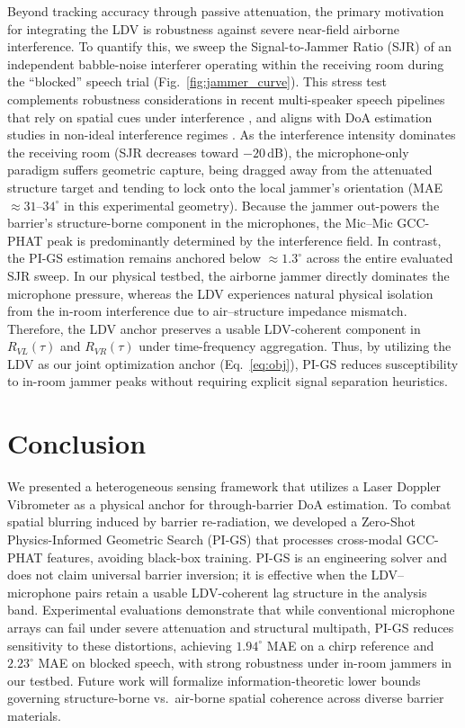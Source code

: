 \documentclass{Interspeech}
\begin{document}
Beyond tracking accuracy through passive attenuation, the primary motivation for integrating the LDV is robustness against severe near-field airborne interference. To quantify this, we sweep the Signal-to-Jammer Ratio (SJR) of an independent babble-noise interferer operating within the receiving room during the ``blocked'' speech trial (Fig.~\ref{fig:jammer_curve}). 
This stress test complements robustness considerations in recent multi-speaker speech pipelines that rely on spatial cues under interference \cite{wechsler2023multi, zhang2024tse}, and aligns with DoA estimation studies in non-ideal interference regimes \cite{feintuch2023neural}. As the interference intensity dominates the receiving room (SJR decreases toward $-20$\,dB), the microphone-only paradigm suffers geometric capture, being dragged away from the attenuated structure target and tending to lock onto the local jammer's orientation (MAE $\approx 31$--$34^\circ$ in this experimental geometry). Because the jammer out-powers the barrier's structure-borne component in the microphones, the Mic--Mic GCC-PHAT peak is predominantly determined by the interference field. In contrast, the PI-GS estimation remains anchored below $\approx 1.3^\circ$ across the entire evaluated SJR sweep. In our physical testbed, the airborne jammer directly dominates the microphone pressure, whereas the LDV experiences natural physical isolation from the in-room interference due to air--structure impedance mismatch. Therefore, the LDV anchor preserves a usable LDV-coherent component in $R_{VL}(\tau)$ and $R_{VR}(\tau)$ under time-frequency aggregation. Thus, by utilizing the LDV as our joint optimization anchor (Eq.~\ref{eq:obj}), PI-GS reduces susceptibility to in-room jammer peaks without requiring explicit signal separation heuristics.

\section{Conclusion}
\label{sec:conclusion}

We presented a heterogeneous sensing framework that utilizes a Laser Doppler Vibrometer as a physical anchor for through-barrier DoA estimation. To combat spatial blurring induced by barrier re-radiation, we developed a Zero-Shot Physics-Informed Geometric Search (PI-GS) that processes cross-modal GCC-PHAT features, avoiding black-box training. PI-GS is an engineering solver and does not claim universal barrier inversion; it is effective when the LDV--microphone pairs retain a usable LDV-coherent lag structure in the analysis band. Experimental evaluations demonstrate that while conventional microphone arrays can fail under severe attenuation and structural multipath, PI-GS reduces sensitivity to these distortions, achieving $1.94^\circ$ MAE on a chirp reference and $2.23^\circ$ MAE on blocked speech, with strong robustness under in-room jammers in our testbed. Future work will formalize information-theoretic lower bounds governing structure-borne vs.\ air-borne spatial coherence across diverse barrier materials.



\end{document}
